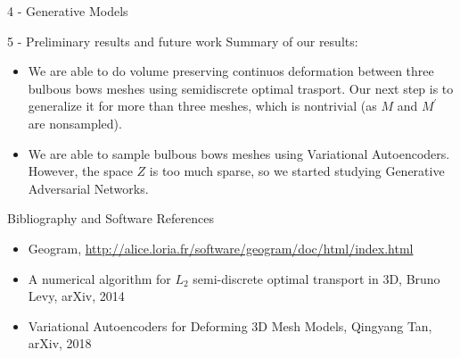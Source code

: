 \documentclass[b0paper,portrait]{baposter}
\begin{document}
\begin{poster}
\begin{posterbox}[name=vae,below=otm,span=6,column=0]{4
    - Generative Models }
\begin{itemize}
\end{itemize}
\end{posterbox}
\begin{posterbox}[name=results,below=vae,span=6,column=0]{5
    - Preliminary results and future work}
Summary of our results:
\begin{itemize}
\item We are able to do volume preserving continuos deformation between three bulbous bows meshes using semidiscrete optimal trasport. Our next step is to generalize it for more than three meshes, which is nontrivial (as $M$ and $M^{\prime}$ are nonsampled).
\item We are able to sample bulbous bows meshes using Variational Autoencoders. However, the space $Z$ is too much sparse, so we started studying Generative Adversarial Networks. 
\end{itemize}
\end{posterbox}
\begin{posterbox}[name=bibliography,below=results,span=6,column=0]{Bibliography and Software References}
\begin{itemize}
\item Geogram, \url{http://alice.loria.fr/software/geogram/doc/html/index.html}
\item A numerical algorithm for $L_{2}$ semi-discrete optimal transport in 3D, Bruno Levy, arXiv, 2014
\item Variational Autoencoders for Deforming 3D Mesh Models, Qingyang Tan, arXiv, 2018
\end{itemize}
\end{posterbox}

\end{poster}
\end{document}
